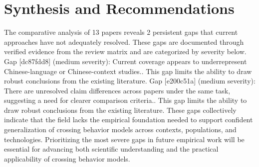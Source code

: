 \documentclass{article}
\begin{document}
\section{Synthesis and Recommendations}
The comparative analysis of 13 papers reveals 2 persistent gaps that current approaches have not adequately resolved. These gaps are documented through verified evidence from the review matrix and are categorized by severity below. Gap [dc87fdd8] (medium severity): Current coverage appears to underrepresent Chinese-language or Chinese-context studies.. This gap limits the ability to draw robust conclusions from the existing literature. Gap [e200c51a] (medium severity): There are unresolved claim differences across papers under the same task, suggesting a need for clearer comparison criteria.. This gap limits the ability to draw robust conclusions from the existing literature. These gaps collectively indicate that the field lacks the empirical foundation needed to support confident generalization of crossing behavior models across contexts, populations, and technologies. Prioritizing the most severe gaps in future empirical work will be essential for advancing both scientific understanding and the practical applicability of crossing behavior models.
\end{document}
